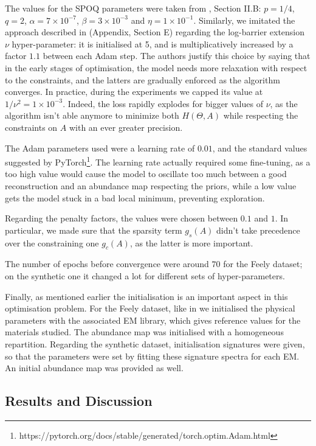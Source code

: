 \documentclass{article}
\begin{document}
The values for the SPOQ parameters were taken from \citet{cherni_spoq_2020}, Section II.B: $p=1/4$, $q=2$, $\alpha=7 \times 10^{-7}$, $\beta = 3 \times 10^{-3}$ and $\eta= 1 \times 10^{-1}$. Similarly, we imitated the approach described in \citet{kervadec_constrained_2020} (Appendix, Section E) regarding the log-barrier extension $\nu$ hyper-parameter: it is initialised at 5, and is multiplicatively increased by a factor $1.1$ between each Adam step. The authors justify this choice by saying that in the early stages of optimisation, the model needs more relaxation with respect to the constraints, and the latters are gradually enforced as the algorithm converges. In practice, during the experiments we capped its value at $1/\nu^2 = 1 \times 10^{-3}$. Indeed, the loss rapidly explodes for bigger values of $\nu$, as the algorithm isn't able anymore to minimize both $H(\Theta, A)$ while respecting the constraints on $A$ with an ever greater precision.

The Adam parameters used were a learning rate of $0.01$, and the standard values suggested by \textsf{PyTorch}\footnote{https://pytorch.org/docs/stable/generated/torch.optim.Adam.html}. The learning rate actually required some fine-tuning, as a too high value would cause the model to oscillate too much between a good reconstruction and an abundance map respecting the priors, while a low value gets the model stuck in a bad local minimum, preventing exploration.

Regarding the penalty factors, the values were chosen between $0.1$ and $1$. In particular, we made sure that the sparsity term $g_s(A)$ didn't take precedence over the constraining one $g_c(A)$, as the latter is more important.

The number of epochs before convergence were around $70$ for the Feely dataset; on the synthetic one it changed a lot for different sets of hyper-parameters.

Finally, as mentioned earlier the initialisation is an important aspect in this optimisation problem. For the Feely dataset, like in \citet{janiczek_differentiable_2020} we initialised the physical parameters with the associated EM library, which gives reference values for the materials studied. The abundance map was initialised with a homogeneous repartition. Regarding the synthetic dataset, initialisation signatures were given, so that the parameters were set by fitting these signature spectra for each EM. An initial abundance map was provided as well.

\subsection{Results and Discussion}
\end{document}
